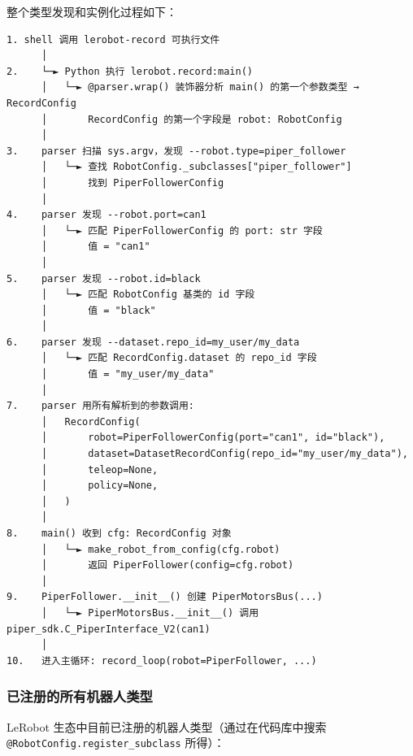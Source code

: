 \documentclass[UTF8,a4paper,11pt]{ctexart}
\begin{document}
整个类型发现和实例化过程如下：

\begin{lstlisting}[language=text]
1. shell 调用 lerobot-record 可执行文件
      │
2.    └─► Python 执行 lerobot.record:main()
      │   └─► @parser.wrap() 装饰器分析 main() 的第一个参数类型 → RecordConfig
      │       RecordConfig 的第一个字段是 robot: RobotConfig
      │
3.    parser 扫描 sys.argv，发现 --robot.type=piper_follower
      │   └─► 查找 RobotConfig._subclasses["piper_follower"]
      │       找到 PiperFollowerConfig
      │
4.    parser 发现 --robot.port=can1
      │   └─► 匹配 PiperFollowerConfig 的 port: str 字段
      │       值 = "can1"
      │
5.    parser 发现 --robot.id=black
      │   └─► 匹配 RobotConfig 基类的 id 字段
      │       值 = "black"
      │
6.    parser 发现 --dataset.repo_id=my_user/my_data
      │   └─► 匹配 RecordConfig.dataset 的 repo_id 字段
      │       值 = "my_user/my_data"
      │
7.    parser 用所有解析到的参数调用:
      │   RecordConfig(
      │       robot=PiperFollowerConfig(port="can1", id="black"),
      │       dataset=DatasetRecordConfig(repo_id="my_user/my_data"),
      │       teleop=None,
      │       policy=None,
      │   )
      │
8.    main() 收到 cfg: RecordConfig 对象
      │   └─► make_robot_from_config(cfg.robot)
      │       返回 PiperFollower(config=cfg.robot)
      │
9.    PiperFollower.__init__() 创建 PiperMotorsBus(...)
      │   └─► PiperMotorsBus.__init__() 调用 piper_sdk.C_PiperInterface_V2(can1)
      │
10.   进入主循环: record_loop(robot=PiperFollower, ...)
\end{lstlisting}

\subsubsection{已注册的所有机器人类型}

LeRobot 生态中目前已注册的机器人类型（通过在代码库中搜索 \texttt{@RobotConfig.register_subclass} 所得）：
\end{document}
